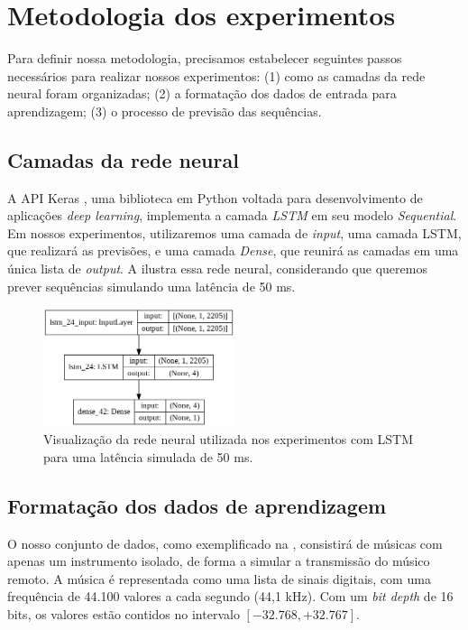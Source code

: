 \section{Metodologia dos experimentos}
\label{sec:lstm-metodology}

Para definir nossa metodologia, precisamos estabelecer seguintes passos necessários para realizar nossos experimentos: (1) como as camadas da rede neural foram organizadas; (2) a formatação dos dados de entrada para aprendizagem; (3) o processo de previsão das sequências.

\subsection{Camadas da rede neural}

A API Keras \cite{keras}, uma biblioteca em Python voltada para desenvolvimento de aplicações \textit{deep learning}, implementa a camada \textit{LSTM} em seu modelo \textit{Sequential}. Em nossos experimentos, utilizaremos uma camada de \textit{input}, uma camada LSTM, que realizará as previsões, e uma camada \textit{Dense}, que reunirá as camadas em uma única lista de \textit{output}. A  ilustra essa rede neural, considerando que queremos prever sequências simulando uma latência de 50 ms.

\begin{figure}[htbp]
    \centering
    \includegraphics[width=0.5\textwidth]{images/lstm-rnn.png}
    \caption{Visualização da rede neural utilizada nos experimentos com LSTM para uma latência simulada de 50 ms.}
    \label{fig:lstm-rnn}
\end{figure}

\subsection{Formatação dos dados de aprendizagem}
\label{subsec:input_lstm}

O nosso conjunto de dados, como exemplificado na , consistirá de músicas com apenas um instrumento isolado, de forma a simular a transmissão do músico remoto. A música é representada como uma lista de sinais digitais, com uma frequência de 44.100 valores a cada segundo (44,1 kHz). Com um \textit{bit depth} de 16 bits, os valores estão contidos no intervalo $[-32.768, +32.767]$.

